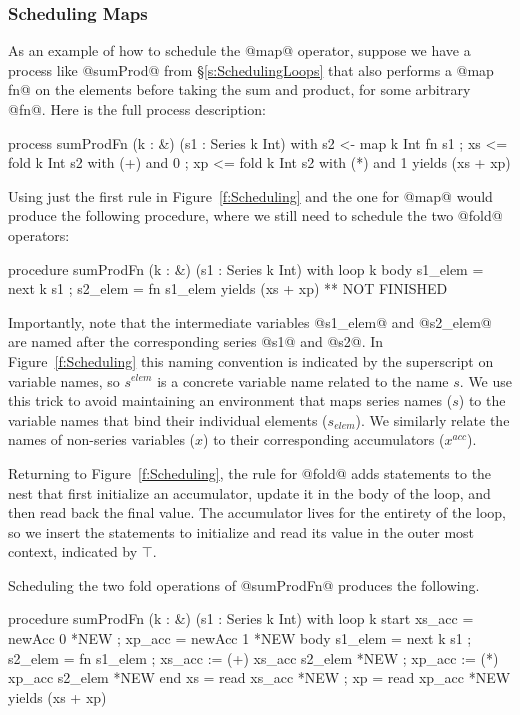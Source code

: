 \subsubsection{Scheduling Maps}
\label{s:SchedulingMaps}
As an example of how to schedule the @map@ operator, suppose we have a process like @sumProd@ from \S\ref{s:SchedulingLoops} that also performs a @map fn@ on the elements before taking the sum and product, for some arbitrary @fn@. Here is the full process description:

\begin{code}
 process sumProdFn (k : &) (s1 : Series k Int)
  with { s2  <- map  k Int fn s1
       ; xs  <= fold k Int s2 with (+) and 0
       ; xp  <= fold k Int s2 with (*) and 1 }
  yields (xs + xp)
\end{code}
%
Using just the first rule in Figure~\ref{f:Scheduling} and the one for @map@ would produce the following procedure, where we still need to schedule the two @fold@ operators:
%
\begin{code}
 procedure sumProdFn (k : &) (s1 : Series k Int)
  with loop k
       body  { s1_elem   = next k s1
             ; s2_elem   = fn s1_elem }
  yields (xs + xp)                  ** NOT FINISHED
\end{code}
%
Importantly, note that the intermediate variables @s1_elem@ and @s2_elem@ are named after the corresponding series @s1@ and @s2@. In Figure~\ref{f:Scheduling} this naming convention is indicated by the superscript on variable names, so $s^{elem}$ is a concrete variable name related to the name $s$. We use this trick to avoid maintaining an environment that maps series names ($s$) to the variable names that bind their individual elements ($s_{elem}$). We similarly relate the names of non-series variables ($x$) to their corresponding accumulators ($x^{acc}$). 

Returning to Figure~\ref{f:Scheduling}, the rule for @fold@ adds statements to the nest that first initialize an accumulator, update it in the body of the loop, and then read back the final value. The accumulator lives for the entirety of the loop, so we insert the statements to initialize and read its value in the outer most context, indicated by $\top$.

\eject
Scheduling the two fold operations of @sumProdFn@ produces the following.

\begin{code}
 procedure sumProdFn (k : &) (s1 : Series k Int)
 with loop k
      start { xs_acc    = newAcc 0             *NEW
            ; xp_acc    = newAcc 1 }           *NEW
      body  { s1_elem   = next k s1
            ; s2_elem   = fn s1_elem   
            ; xs_acc   := (+) xs_acc s2_elem   *NEW
            ; xp_acc   := (*) xp_acc s2_elem } *NEW
      end   { xs        = read xs_acc          *NEW
            ; xp        = read xp_acc }        *NEW
 yields (xs + xp)
\end{code}

